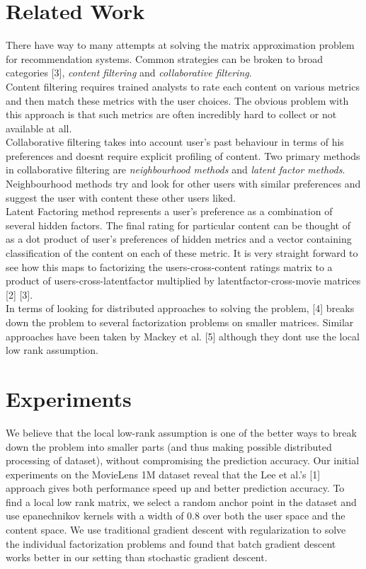 \documentclass{article} %
\begin{document}
\section{Related Work}
There have way to many attempts at solving the matrix approximation problem for recommendation systems. Common strategies can be broken to broad categories [3], {\it content filtering} and {\it collaborative filtering}.\\
Content filtering requires trained analysts to rate each content on various metrics and then match these metrics with the user choices. The obvious problem with this approach is that such metrics are often incredibly hard to collect or not available at all.\\
Collaborative filtering takes into account user's past behaviour in terms of his preferences and doesnt require explicit profiling of content. Two primary methods in collaborative filtering are {\it neighbourhood methods} and {\it latent factor methods}. Neighbourhood methods try and look for other users with similar preferences and suggest the user with content these other users liked. \\
Latent Factoring method represents a user's preference as a combination of several hidden factors. The final rating for particular content can be thought of as a dot product of user's preferences of hidden metrics and a vector containing classification of the content on each of these metric. It is very straight forward to see how this maps to factorizing the users-cross-content ratings matrix to a product of users-cross-latentfactor multiplied by latentfactor-cross-movie matrices [2] [3].\\
In terms of looking for distributed approaches to solving the problem, [4] breaks down the problem to several factorization problems on smaller matrices. Similar approaches have been taken by Mackey et al. [5] although they dont use the local low rank assumption.

\section{Experiments}
We believe that the local low-rank assumption is one of the better ways to break down the problem into smaller parts (and thus making possible distributed processing of dataset), without compromising the prediction accuracy. Our initial experiments on the MovieLens 1M dataset reveal that the Lee et al.'s [1] approach gives both performance speed up and better prediction accuracy. To find a local low rank matrix, we select a random anchor point in the dataset and use epanechnikov kernels with a width of 0.8 over both the user space and the content space. We use traditional gradient descent with regularization to solve the individual factorization problems and found that batch gradient descent works better in our setting than stochastic gradient descent. 
\end{document}
